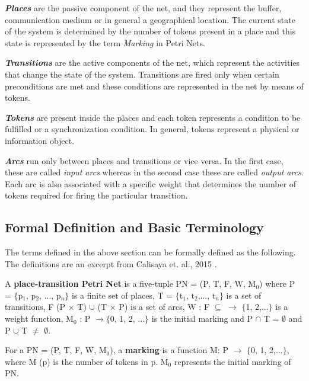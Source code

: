 \textbf{\textit{Places}} are the passive component of the net, and they represent the buffer, communication medium or in general a geographical location. The current state of the system is determined by the number of tokens present in a place and this state is represented by the term \textit{Marking} in Petri Nets.

\textbf{\textit{Transitions}} are the active components of the net, which represent the activities that change the state of the system. Transitions are fired only when certain preconditions are met and these conditions are represented in the net by means of tokens.

\textbf{\textit{Tokens}} are present inside the places and each token represents a condition to be fulfilled or a synchronization condition. In general, tokens represent a physical or information object.

\textbf{\textit{Arcs}} run only between places and transitions or vice versa. In the first case, these are called \textit{input arcs} whereas in the second case these are called \textit{output arcs}. Each arc is also associated with a specific weight that determines the number of tokens required for firing the particular transition.

\subsection{Formal Definition and Basic Terminology}
The terms defined in the above section can be formally defined as the following. The definitions are an excerpt from Calisaya et. al., 2015 \cite{calisaya2016analysis}.

\begin{definition}
\label{def:def1}
A \textbf{place-transition Petri Net} \cite{reisig2012petri}  is a five-tuple PN = (P, T, F, W, M$_{0}$) where P = $ \lbrace $p$_{1}$, p$_{2}$, ..., p$_{n} \rbrace $ is a finite set of places, T = $ \lbrace $t$_{1}$, t$_{2}$,..., t$_{n} \rbrace $ is a set of transitions, F   (P $\times$ T) $ \cup $ (T $\times$ P) is a set of arcs, W : F $ \subseteq $ $ \rightarrow$ $ \lbrace $1, 2,...$ \rbrace $ is a weight function, M$_{0}$ : P  $ \rightarrow\lbrace $0, 1, 2, ...$ \rbrace $ is the initial marking and P $ \cap $ T = $\emptyset $ and P $ \cup $ T 
$ \neq $ $ \emptyset $.
\end{definition}

\begin{definition}
\label{def:def2}
For a PN = (P, T, F, W, M$_{0}$), a \textbf{marking} is a function M: P $  \rightarrow$ $ \lbrace $0, 1, 2,...$ \rbrace $, where M (p) is the number of tokens in p. M$_{0}$ represents the initial marking of PN.
\end{definition}


